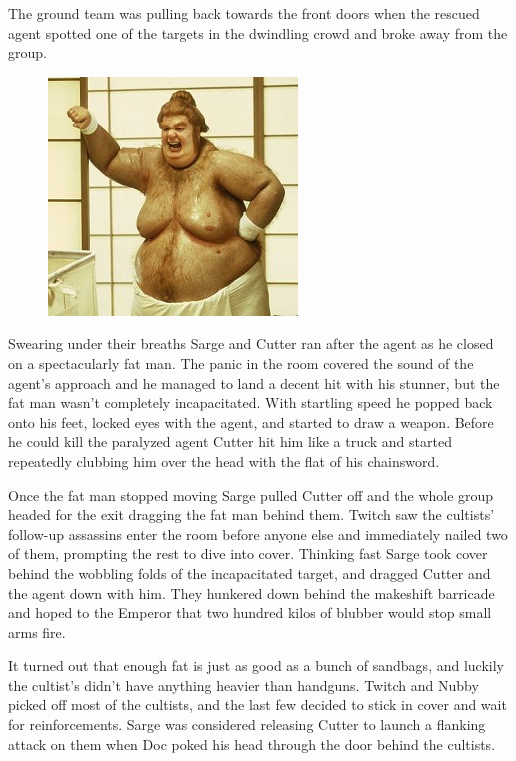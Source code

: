 The ground team was pulling back towards the front doors when the rescued agent spotted one of the targets in the dwindling crowd and broke away from the group.

\begin{figure}
	\begin{center}
		\includegraphics[width=\figwidth]{pics/5/14.png}
	\end{center}
\end{figure}
Swearing under their breaths Sarge and Cutter ran after the agent as he closed on a spectacularly fat man. 
The panic in the room covered the sound of the agent’s approach and he managed to land a decent hit with his stunner, but the fat man wasn’t completely incapacitated. 
With startling speed he popped back onto his feet, locked eyes with the agent, and started to draw a weapon. 
Before he could kill the paralyzed agent Cutter hit him like a truck and started repeatedly clubbing him over the head with the flat of his chainsword. 

Once the fat man stopped moving Sarge pulled Cutter off and the whole group headed for the exit dragging the fat man behind them. 
Twitch saw the cultists’ follow-up assassins enter the room before anyone else and immediately nailed two of them, prompting the rest to dive into cover. 
Thinking fast Sarge took cover behind the wobbling folds of the incapacitated target, and dragged Cutter and the agent down with him. 
They hunkered down behind the makeshift barricade and hoped to the Emperor that two hundred kilos of blubber would stop small arms fire.

It turned out that enough fat is just as good as a bunch of sandbags, and luckily the cultist’s didn’t have anything heavier than handguns. 
Twitch and Nubby picked off most of the cultists, and the last few decided to stick in cover and wait for reinforcements. 
Sarge was considered releasing Cutter to launch a flanking attack on them when Doc poked his head through the door behind the cultists.

